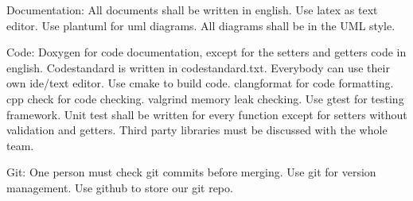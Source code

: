 Documentation:
All documents shall be written in english.
Use latex as text editor.
Use plantuml for uml diagrams. All diagrams shall be in the UML style.


Code:
Doxygen for code documentation, except for the setters and getters
code in english.
Codestandard is written in codestandard.txt.
Everybody can use their own ide/text editor.
Use cmake to build code.
clangformat for code formatting.
cpp check for code checking.
valgrind memory leak checking.
Use gtest for testing framework.
Unit test shall be written for every function except for setters without validation and getters.
Third party libraries must be discussed with the whole team.

Git:
One person must check git commits before merging.
Use git for version management. Use github to store our git repo.


